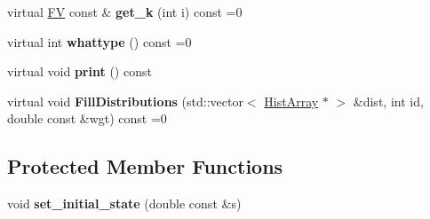 \begin{DoxyCompactItemize}
\item 
\hypertarget{classPS__2_aa23e50a0b5d3ac32fb63afb4f67d3910}{virtual \hyperlink{classFV}{F\-V} const \& {\bfseries get\-\_\-k} (int i) const =0}\label{classPS__2_aa23e50a0b5d3ac32fb63afb4f67d3910}

\item 
\hypertarget{classPS__2_ac3bb7468d7b1e1b62018f13a1121e86a}{virtual int {\bfseries whattype} () const =0}\label{classPS__2_ac3bb7468d7b1e1b62018f13a1121e86a}

\item 
\hypertarget{classPS__2_a395f9455cfdebcfd145ba679c43ac2c5}{virtual void {\bfseries print} () const }\label{classPS__2_a395f9455cfdebcfd145ba679c43ac2c5}

\item 
\hypertarget{classPS__2_afa5352effb960f14e54fc30432fc4923}{virtual void {\bfseries Fill\-Distributions} (std\-::vector$<$ \hyperlink{classHistArray}{Hist\-Array} $\ast$ $>$ \&dist, int id, double const \&wgt) const =0}\label{classPS__2_afa5352effb960f14e54fc30432fc4923}

\end{DoxyCompactItemize}
\subsection*{Protected Member Functions}
\begin{DoxyCompactItemize}
\item 
\hypertarget{classPS__2_a6d49cef4b1eb1138b947c9ec9b448538}{void {\bfseries set\-\_\-initial\-\_\-state} (double const \&s)}\label{classPS__2_a6d49cef4b1eb1138b947c9ec9b448538}

\end{DoxyCompactItemize}
